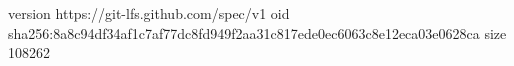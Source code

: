 version https://git-lfs.github.com/spec/v1
oid sha256:8a8c94df34af1c7af77dc8fd949f2aa31c817ede0ec6063c8e12eca03e0628ca
size 108262
